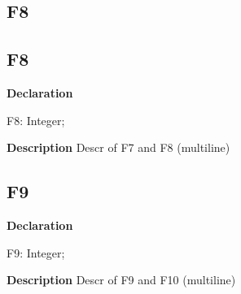 \documentclass{report}
\newif\ifpdf
\begin{document}
\subsection*{\large{\textbf{F8}}\normalsize\hspace{1ex}\hrulefill}
\else
\subsection*{F8}
\fi
\label{ok_multiple_fields-F8}
\begin{list}{}{
\setlength{\itemindent}{0cm}
\setlength{\listparindent}{0cm}
\setlength{\leftmargin}{\evensidemargin}
\addtolength{\leftmargin}{\tmplength}
\settowidth{\labelsep}{X}
\addtolength{\leftmargin}{\labelsep}
\setlength{\labelwidth}{\tmplength}
}
\item[\textbf{Declaration}\hfill]
\ifpdf
\begin{flushleft}
\fi
\begin{ttfamily}
F8: Integer;\end{ttfamily}

\ifpdf
\end{flushleft}
\fi

\par
\item[\textbf{Description}]
Descr of F7 and F8 (multiline)

\end{list}
\ifpdf
\subsection*{\large{\textbf{F9}}\normalsize\hspace{1ex}\hrulefill}
\else
\subsection*{F9}
\fi
\label{ok_multiple_fields-F9}
\begin{list}{}{
\setlength{\itemindent}{0cm}
\setlength{\listparindent}{0cm}
\setlength{\leftmargin}{\evensidemargin}
\addtolength{\leftmargin}{\tmplength}
\settowidth{\labelsep}{X}
\addtolength{\leftmargin}{\labelsep}
\setlength{\labelwidth}{\tmplength}
}
\item[\textbf{Declaration}\hfill]
\ifpdf
\begin{flushleft}
\fi
\begin{ttfamily}
F9: Integer;\end{ttfamily}

\ifpdf
\end{flushleft}
\fi

\par
\item[\textbf{Description}]
Descr of F9 and F10 (multiline)

\end{list}
\ifpdf
\end{document}
